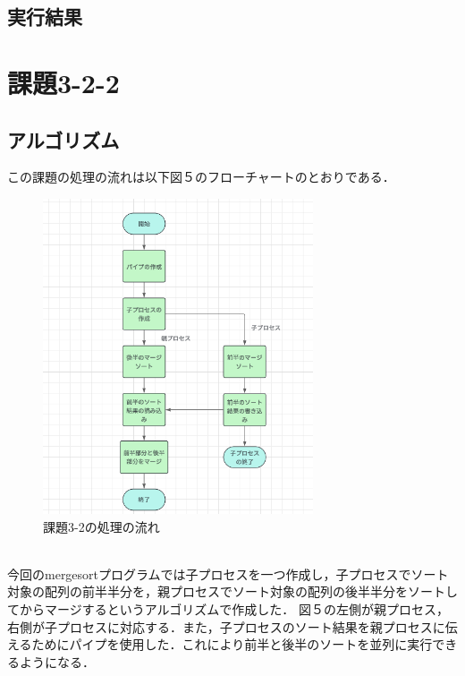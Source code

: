 \documentclass[dvipdfmx]{jarticle}
\begin{document}
\subsection{実行結果}
\section{課題3-2-2}
\subsection{アルゴリズム}
この課題の処理の流れは以下図５のフローチャートのとおりである．
\begin{figure}[h]
    \centering
    \includegraphics[width=8cm]{3-2-2hurotya.png}
    \caption{課題3-2の処理の流れ}
\end{figure}
\\
今回のmergesortプログラムでは子プロセスを一つ作成し，子プロセスでソート対象の配列の前半半分を，親プロセスでソート対象の配列の後半半分をソートしてからマージするというアルゴリズムで作成した．
図５の左側が親プロセス，右側が子プロセスに対応する．また，子プロセスのソート結果を親プロセスに伝えるためにパイプを使用した．これにより前半と後半のソートを並列に実行できるようになる．
\end{document}
